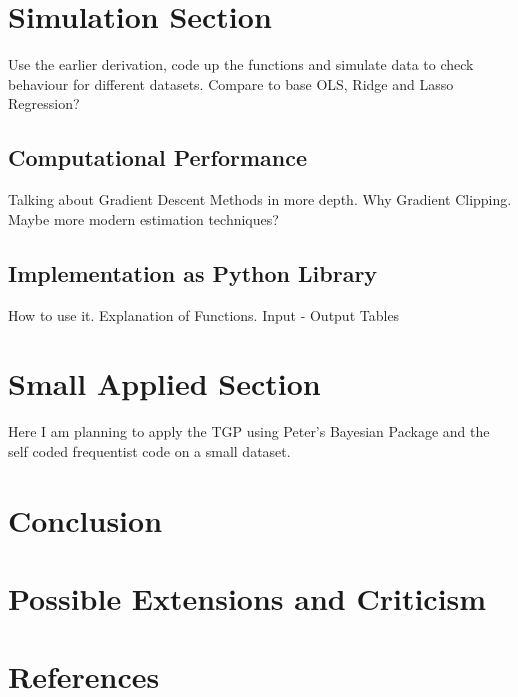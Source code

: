 \documentclass[12pt,a4paper]{article}
\begin{document}
\section{Simulation Section}
Use the earlier derivation, code up the functions and simulate data to check behaviour for different datasets. Compare to base OLS, Ridge and Lasso Regression?
\subsection{Computational Performance}
Talking about Gradient Descent Methods in more depth. Why Gradient Clipping. Maybe more modern estimation techniques? 
\subsection{Implementation as Python Library}

How to use it. 
Explanation of Functions. Input - Output Tables

\section{Small Applied Section}
Here I am planning to apply the TGP using Peter's Bayesian Package and the self coded frequentist code on a small dataset.
\section{Conclusion}
\section{Possible Extensions and Criticism}
\section{References}

\pagebreak
{}
\setcounter{page}{\thesavepage}
\pagestyle{plain}
%
%
\printbibliography[]
\clearpage
\appendix
\end{document}
